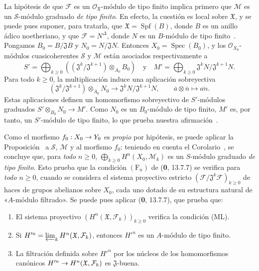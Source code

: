 \documentclass[10pt,oneside,openany]{book}
\theoremstyle{egaenv}\newtheorem*{env}{---}
\theoremstyle{egastatement}
\theoremstyle{egadescription}
\newcommand{\oldpage}[2][]{\marginnote{\normalfont\scriptsize\textbf{#1}\,|\,#2}\ignorespaces}
\renewcommand{\geq}{\geqslant}
\renewcommand{\to}{\mathchoice{\longrightarrow}{\rightarrow}{\rightarrow}{\rightarrow}}
\begin{document}
\begingroup
{}
La hipótesis de que $\mathcal F$ es un $\mathcal O_{\mathfrak X}$-módulo de tipo finito implica primero que $\mathcal M$ es
\oldpage[III]{121}
un $\mathcal S$-módulo graduado \emph{de tipo finito}.
En efecto, la cuestión es local sobre $\mathfrak X$, y se puede pues suponer, para tratarla, que $\mathfrak X=\operatorname{Spf}(B)$, donde $B$ es un anillo ádico noetheriano, y que $\mathcal F=N^\Delta$, donde $N$ es un $B$-módulo de tipo finito~.
Pongamos $B_0=B/\mathfrak J B$ y $N_0=N/\mathfrak JN$.
Entonces $X_0=\operatorname{Spec}(B_0)$, y los $\mathcal O_{X_0}$-módulos cuasicoherentes $\mathcal S$ y $\mathcal M$ están asociados respectivamente a
\[
S'=\bigoplus_{k\geq0}
((\mathfrak J^k/\mathfrak J^{k+1})\otimes_{A_0}B_0)\quad\text{y}\quad
M'=\bigoplus_{k\geq0}\mathfrak J^kN/\mathfrak J^{k+1}N.
\]
Para todo $k\geq0$, la multiplicación induce una aplicación sobreyectiva
\[
(\mathfrak J^k/\mathfrak J^{k+1})\otimes_{A_0}N_0
\longrightarrow\mathfrak J^kN/\mathfrak J^{k+1}N,
\qquad \overline a\otimes\overline n\longmapsto\overline{an}.
\]
Estas aplicaciones definen un homomorfismo sobreyectivo de $S'$-módulos graduados $S'\otimes_{B_0}N_0\longrightarrow M'$.
Como $N_0$ es un $B_0$-módulo de tipo finito, $M'$ es, por tanto, un $S'$-módulo de tipo finito, lo que prueba nuestra afirmación~.
\par\endgroup

Como el morfismo $f_0:X_0\to Y_0$ es \emph{propio} por hipótesis, se puede aplicar la Proposición~ a $\mathcal S$, $\mathcal M$ y al morfismo $f_0$: teniendo en cuenta el Corolario~, se concluye que, para \emph{todo $n\geq0$}, $\bigoplus_{k\geq0}H^n(X_0,\mathcal M_k)$ es un $S$-módulo graduado \emph{de
tipo finito}. Esto prueba que la condición $(\mathrm F_n)$ de (\textbf{0}, 13.7.7) se
verifica para \emph{todo $n\geq0$}, cuando se considera el sistema proyectivo estricto $(\mathcal F/\mathfrak J^k\mathcal F)_{k\geq0}$ de haces de grupos abelianos sobre $X_0$, cada uno dotado de su estructura natural de «$A$-módulo filtrado». Se puede pues aplicar (\textbf{0}, 13.7.7), que prueba que:
\begin{enumerate}
\item[$1^\circ$] El sistema proyectivo
$(H^n(\mathfrak X,\mathcal F_k))_{k\geq0}$ verifica la condición (ML).
\item[$2^\circ$] Si
$H'^{n}=\varprojlim_kH^n(\mathfrak X,\mathcal F_k)$, entonces $H'^{n}$ es un $A$-módulo de tipo finito.
\item[$3^\circ$] La filtración definida sobre $H'^{n}$ por los núcleos de los homomorfismos canónicos $H'^{n}\to H^n(\mathfrak X,\mathcal F_k)$ es $\mathfrak J$-buena.
\end{enumerate}
\end{document}
